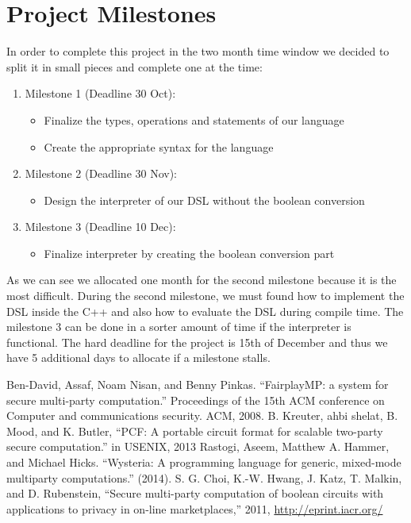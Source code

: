 \documentclass[paper=a4, fontsize=11pt]{scrartcl} %
\numberwithin{equation}{section} %
\numberwithin{figure}{section} %
\numberwithin{table}{section} %
\begin{document}
\section{Project Milestones}
In order to complete this project in the two month time window we decided to split it in small pieces and complete one at the time:
\begin{enumerate}
\item Milestone 1 (Deadline 30 Oct):
\begin{itemize}
\item Finalize the types, operations and statements of our language
\item Create the appropriate syntax for the language
\end{itemize}
\item Milestone 2 (Deadline 30 Nov):
\begin{itemize}
\item Design the interpreter of our DSL without the boolean conversion
\end{itemize}
\item Milestone 3 (Deadline 10 Dec):
\begin{itemize}
\item Finalize interpreter by creating the boolean conversion part
\end{itemize}
\end{enumerate}
As we can see we allocated one month for the second milestone because it is the most difficult. During the second milestone, we must found how to implement the DSL inside the C++ and also how to evaluate the DSL during compile time. The milestone 3 can be done in a sorter amount of time if the interpreter is functional. The hard deadline for the project is 15th of December and thus we have 5 additional days to allocate if a milestone stalls.
\begin{thebibliography}{9}
Ben-David, Assaf, Noam Nisan, and Benny Pinkas. ``FairplayMP: a system for secure multi-party computation.'' Proceedings of the 15th ACM conference on Computer and communications security. ACM, 2008.
 B. Kreuter, ahbi shelat, B. Mood, and K. Butler, ``PCF: A portable
circuit format for scalable two-party secure computation.'' in USENIX,
2013
Rastogi, Aseem, Matthew A. Hammer, and Michael Hicks. ``Wysteria: A programming language for generic, mixed-mode multiparty computations.'' (2014).
S. G. Choi, K.-W. Hwang, J. Katz, T. Malkin, and D. Rubenstein,
“Secure multi-party computation of boolean circuits with applications to
privacy in on-line marketplaces,” 2011, \url{http://eprint.iacr.org/}
\end{thebibliography}
\end{document}
